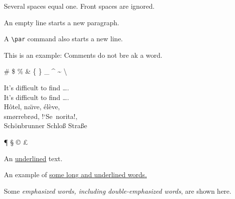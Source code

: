 \documentclass{article}
\begin{document}
Several spaces             equal one.
      Front spaces are ignored.

An empty line starts a new
paragraph.\par
A \verb|\par| command also
starts a new line.

This is an %
example: Comments do not bre%
ak a word.

\# \$ \% \& \{ \} \_
\^{} \~{} \textbackslash

It's difficult to find \ldots .\\
It's dif{}f{}icult to f{}ind \ldots .\\

H\^otel, na\"\i ve, \'el\`eve,\\
sm\o rrebr\o d, !`Se\ norita!,\\
Sch\"onbrunner Schlo\ss{}
Stra\ss e

\P{} \S{} \dag{} \ddag{}
\copyright{} \pounds{}
\textasteriskcentered
\textperiodcentered
\textbullet
\textregistered{} \texttrademark

An \underline{underlined} text.

An example of \uline{some
long and underlined words.}

Some \emph{emphasized words,
including \emph{double-emphasized}
words}, are shown here.
\end{document}

